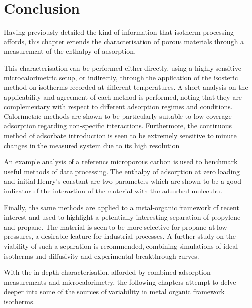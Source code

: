 
\section{Conclusion}

Having previously detailed the kind of information that isotherm
processing affords, this chapter extends the characterisation
of porous materials through a measurement of the enthalpy of 
adsorption.

This characterisation can be performed either 
directly, using a highly sensitive microcalorimetric setup, or 
indirectly, through the application of the isosteric method on
isotherms recorded at different temperatures. A short analysis
on the applicability and agreement of each method is performed,
noting that they are complementary with respect to different
adsorption regimes and conditions. Calorimetric methods
are shown to be particularly suitable to low coverage adsorption 
regarding non-specific interactions. Furthermore, the continuous method
of adsorbate introduction is seen to be extremely sensitive
to minute changes in the measured system due to its high resolution.

An example analysis of a reference microporous carbon is
used to benchmark useful methods of data processing. The 
enthalpy of adsorption at zero loading and initial Henry's 
constant are two parameters which are shown to be a good 
indicator of the interaction of the material with the 
adsorbed molecules.

Finally, the same methods are applied to a metal-organic
framework of recent interest and used to highlight 
a potentially interesting separation of propylene and 
propane. The material is seen to be more selective for 
propane at low pressures, a desirable feature for 
industrial processes. A further study on the viability 
of such a separation is recommended, combining simulations of 
ideal isotherms and diffusivity and experimental breakthrough
curves.

With the in-depth characterisation afforded by combined adsorption
measurements and microcalorimetry, the following chapters attempt
to delve deeper into some of the sources of variability in metal
organic framework isotherms.

\FloatBarrier{}
\pagebreak